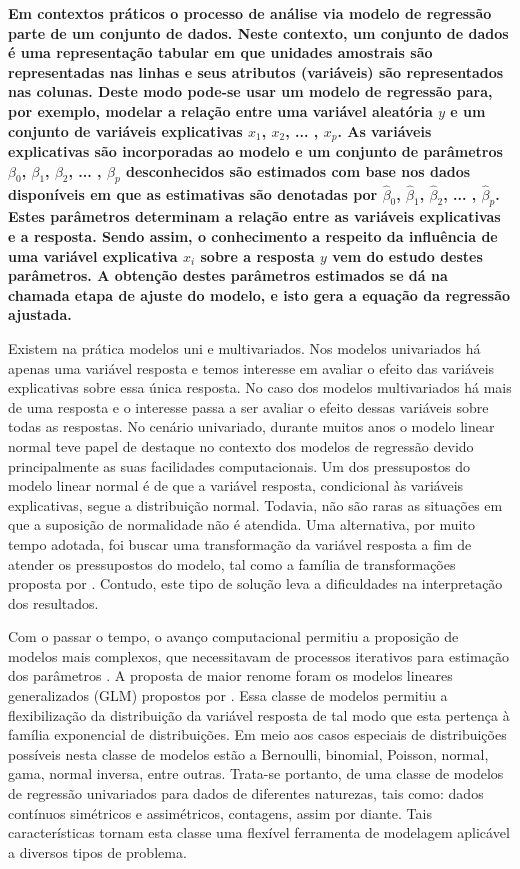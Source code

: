 \textbf{
Em contextos práticos o processo de análise via modelo de regressão parte de um conjunto de dados. Neste contexto, um conjunto de dados é uma representação tabular em que unidades amostrais são representadas nas linhas e seus atributos (variáveis) são representados nas colunas. Deste modo pode-se usar um modelo de regressão para, por exemplo, modelar a relação entre uma variável aleatória $y$ e um conjunto de variáveis explicativas $x_1$, $x_2$, ... , $x_p$. As variáveis explicativas são incorporadas ao modelo e um conjunto de parâmetros $\beta_0$, $\beta_1$, $\beta_2$, ... , $\beta_p$ desconhecidos são estimados com base nos dados disponíveis em que as estimativas são denotadas por $\hat\beta_0$, $\hat\beta_1$, $\hat\beta_2$, ... , $\hat\beta_p$. Estes parâmetros determinam a relação entre as variáveis explicativas e a resposta. Sendo assim, o conhecimento a respeito da influência de uma variável explicativa $x_i$ sobre a resposta $y$ vem do estudo destes parâmetros. A obtenção destes parâmetros estimados se dá na chamada etapa de ajuste do modelo, e isto gera a equação da regressão ajustada.
}

Existem na prática modelos uni e multivariados. Nos modelos univariados há apenas uma variável resposta e temos interesse em avaliar o efeito das variáveis explicativas sobre essa única resposta. No caso dos modelos multivariados há mais de uma resposta e o interesse passa a ser avaliar o efeito dessas variáveis sobre todas as respostas. No cenário univariado, durante muitos anos o modelo linear normal \citep{galton} teve papel de destaque no contexto dos modelos de regressão devido principalmente as suas facilidades computacionais. Um dos pressupostos do modelo linear normal é de que a variável resposta, condicional às variáveis explicativas, segue a distribuição normal. Todavia, não são raras as situações em que a suposição de normalidade não é atendida. Uma alternativa, por muito tempo adotada, foi buscar uma transformação da variável resposta a fim de atender os pressupostos do modelo, tal como a família de transformações proposta por \citet{boxcox64}. Contudo, este tipo de solução leva a dificuldades na interpretação dos resultados.

Com o passar o tempo, o avanço computacional permitiu a proposição de modelos mais complexos, que necessitavam de processos iterativos para estimação dos parâmetros \citep{paula}. A proposta de maior renome foram os modelos lineares generalizados (GLM) propostos por \citet{Nelder72}. Essa classe de modelos permitiu a flexibilização da distribuição da variável resposta de tal modo que esta pertença à família exponencial de distribuições. Em meio aos casos especiais de distribuições possíveis nesta classe de modelos estão a Bernoulli, binomial, Poisson, normal, gama, normal inversa, entre outras. Trata-se portanto, de uma classe de modelos de regressão univariados para dados de diferentes naturezas, tais como: dados contínuos simétricos e assimétricos, contagens, assim por diante. Tais características tornam esta classe uma flexível ferramenta de modelagem aplicável a diversos tipos de problema. 

